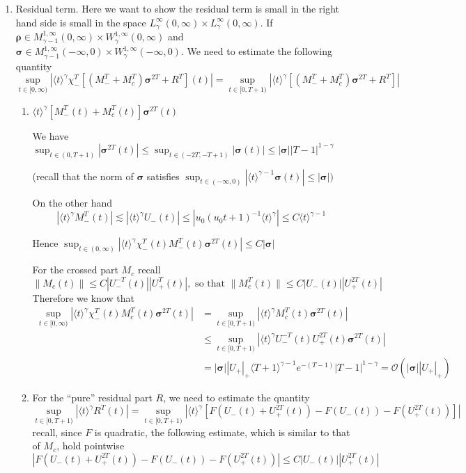 \documentclass[letterpaper,11pt]{article}
\newcommand{\rmO}{\mathcal{O}}
\newcommand{\Rho}{\bm{\rho}}
\newcommand{\bigma}{\bm{\sigma}}
\numberwithin{equation}{section}
\theoremstyle{plain}
\begin{document}
\begin{enumerate}
\item Residual term.
Here we want to show the residual term is small in the right hand side is small in the space $L^{\infty}_\gamma(0,\infty)\times L^{\infty}_\gamma(0,\infty)$. If $\Rho \in M^{1,\infty}_{\gamma-1}(0,\infty) \times W^{1,\infty}_\gamma(0,\infty)$ and $\bigma \in M^{1,\infty}_{\gamma-1}(-\infty,0)\times W^{1,\infty}_\gamma(-\infty,0)$. We need to estimate the following quantity 
\[
\sup_{t \in [0,\infty)}\left| \langle t \rangle^\gamma \chi_-^T[(M_-^T+M_c^T)\bigma^{2T}+R^T] (t)\right| = \sup_{t \in [0,T+1)} \left|\langle t\rangle^{\gamma}[(M_-^T+M_c^T)\bigma^{2T}+R^T] \right|
\]
\begin{enumerate}
\item $\langle t \rangle^\gamma [M_-^T(t)+M_c^T(t)] \bigma^{2T}(t)$ 

We have $\sup_{t \in (0, T+1)} |\bigma^{2T}(t)| \le \sup_{t \in (-2T,-T+1)} |\bigma(t)| \le |\bigma| |T-1|^{1-\gamma}$

(recall that the norm of $\bigma$ satisfies $\sup_{t \in (-\infty,0)}|\langle t \rangle^{\gamma-1}\bigma(t) | \le |\bigma|)$


On the other hand
\[
|\langle t \rangle^{\gamma}M_-^T(t)| \lesssim |\langle t \rangle^\gamma U_-(t)| \le |u_0(u_0 t+1)^{-1} \langle t \rangle^{\gamma}| \le C \langle t \rangle^{\gamma-1}
\]


Hence $\sup_{t \in (0,\infty)}|\langle t \rangle^{\gamma}\chi_-^T(t)M_-^T(t)\bigma^{2T}(t) |\le C| \bigma |$

For the crossed part $M_c$ recall 
\[
\| M_c(t)\| \le C |U_-^{-T}(t)| |U_+^T(t)|, \text{ so that }\| M_c^T(t)\| \le C |U_-(t)| |U_+^{2T}(t)|
\]
Therefore we know that 
\begin{align*}
\sup_{t\in [0,\infty)} |\langle t\rangle^\gamma \chi_-^T(t)M_c^T(t)\bigma^{2T}(t)|  &= \sup_{t\in [0,T+1)} |\langle t\rangle^\gamma  M_c^T(t)\bigma^{2T}(t)|\\  
&\le \sup_{t\in [0,T+1)} |\langle t \rangle^{\gamma}U_-^{-T}(t) U_+^{2T}(t)\bigma^{2T}(t) |\\
& = |\bigma||U_+|_+\langle T+1 \rangle^{\gamma-1} e^{-(T-1)}|T-1|^{1-\gamma} =  \rmO(|\bigma| |U_+|_+)
\end{align*}

\item For the ``pure'' residual part $R$, we need to estimate the quantity
\[
\sup_{t \in [0,T+1)} \left|\langle t \rangle^\gamma R^T(t)\right| = \sup_{t \in [0,T+1)} \left|\langle t \rangle^\gamma [F(U_-(t)+U_+^{2T}(t)) - F(U_-(t))-F(U_+^{2T}(t))] \right|
\]
recall, since $F$ is quadratic, the following estimate, which is similar to that of $M_c$, hold pointwise
\[
|F(U_-(t)+U_+^{2T}(t)) - F(U_-(t))-F(U_+^{2T}(t))| \le C|U_-(t)||U_+^{2T}(t)|
\]


\end{enumerate}
\end{enumerate}
\end{document}
